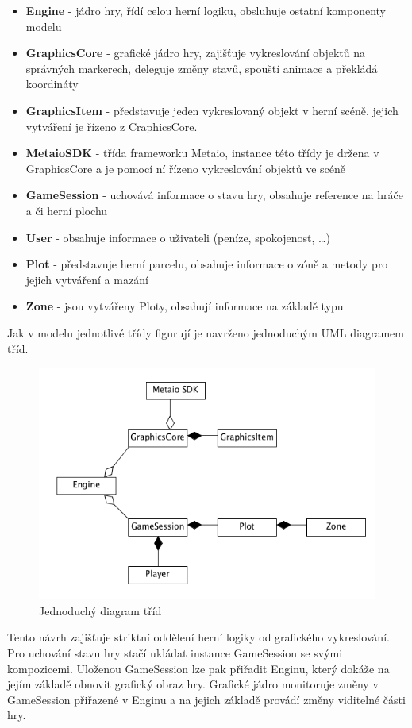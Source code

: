 \documentclass[twoside,12pt]{article}
\begin{document}
\begin{itemize}
	\item \textbf{Engine} - jádro hry, řídí celou herní logiku, obsluhuje ostatní komponenty modelu
	\item \textbf{GraphicsCore} - grafické jádro hry, zajišťuje vykreslování objektů na správných markerech, deleguje změny stavů, spouští animace a překládá koordináty
	\item \textbf{GraphicsItem} - představuje jeden vykreslovaný objekt v herní scéně, jejich vytváření je řízeno z CraphicsCore.
	\item \textbf{MetaioSDK} - třída frameworku Metaio, instance této třídy je držena v GraphicsCore a je pomocí ní řízeno vykreslování objektů ve scéně
	\item \textbf{GameSession} - uchovává informace o stavu hry, obsahuje reference na hráče a či herní plochu
	\item \textbf{User} - obsahuje informace o uživateli (peníze, spokojenost, \dots)
	\item \textbf{Plot} - představuje herní parcelu, obsahuje informace o zóně a metody pro jejich vytváření a mazání
	\item \textbf{Zone} - jsou vytvářeny Ploty, obsahují informace na základě typu
\end{itemize}

Jak v modelu jednotlivé třídy figurují je navrženo jednoduchým UML diagramem tříd.

\begin{figure}[H]
\centering
    \includegraphics[width=424px, center]{images/model.png}
\captionsetup{justification=centering}
    \caption{Jednoduchý diagram tříd}
    \label{class_diagram}
\end{figure}

Tento návrh zajišťuje striktní oddělení herní logiky od grafického vykreslování. Pro uchování stavu hry stačí ukládat instance GameSession se svými kompozicemi. Uloženou GameSession lze pak přiřadit Enginu, který dokáže na jejím základě obnovit grafický obraz hry. Grafické jádro monitoruje změny v GameSession přiřazené v Enginu a na jejich základě provádí změny viditelné části hry. 
\end{document}
